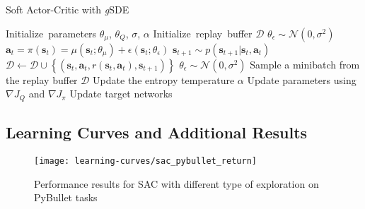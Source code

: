 \documentclass{article}
\newcommand{\state}{\mathbf{s}}
\newcommand{\reward}{r}
\newcommand{\action}{\mathbf{a}}
\newcommand{\at}{{\action_t}}
\newcommand{\st}{{\state_t}}
\newcommand{\policy}{\pi}
\newcommand{\normal}{\mathcal{N}}
\newcommand{\noise}{\epsilon}
\newcommand{\ourSDE}{\textit{g}\textsc{SDE}\xspace}
\begin{document}
\begin{algorithm}[h]
\caption{Soft Actor-Critic with \ourSDE}
\label{algo:sac-sde}
\begin{algorithmic}
\State \mbox{Initialize parameters} $\theta_\mu$, $\theta_Q$, $\sigma$, $\alpha$
\State \mbox{Initialize replay buffer} $\mathcal{D}$
  \State $\theta_\noise \sim \normal(0, \sigma^2)$ 
  	\State $\at = \policy(\st) = \mu(\st; \theta_\mu) + \noise(\st; \theta_\noise)$  
  	\State $\state_{t+1} \sim p(\state_{t+1}| \st, \at)$ 
  	\State $\mathcal{D} \leftarrow \mathcal{D} \cup \left\{(\st, \at, \reward(\st, \at), \state_{t+1})\right\}$
	\EndFor
    \State $\theta_\noise \sim \normal(0, \sigma^2)$ 
    \State Sample a minibatch from the replay buffer $\mathcal{D}$
    \State Update the entropy temperature $\alpha$
    \State Update parameters using $\nabla J_Q$ and $\nabla J_\policy$
    \State Update target networks
	\EndFor
\EndFor
\end{algorithmic}
\end{algorithm}


\subsection{Learning Curves and Additional Results}
\label{sec:learning-curves}

\begin{figure}[h!]
  \centering\texttt{[image: learning-curves/sac\_pybullet\_return]}
  \label{fig:sac-pybullet-return}
  \caption{Performance results for SAC with different type of exploration on PyBullet tasks}
\end{figure}
\end{document}
